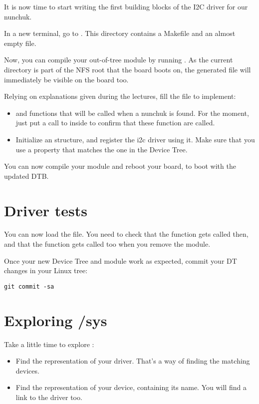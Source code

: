 It is now time to start writing the first building blocks of the I2C
driver for our nunchuk.

In a new terminal, go to
.  This directory
contains a Makefile and an almost empty  file.

Now, you can compile your out-of-tree module by running . As
the current directory is part of the NFS root that the board boots on,
the generated  file will immediately be visible on the board
too.

Relying on explanations given during the lectures, fill the
 file to implement:

\begin{itemize}
\item {} and  functions that will
      be called when a nunchuk is found.
      For the moment, just put a call to  inside
      to confirm that these function are called.
\item Initialize an  structure, and register
      the i2c driver using it. Make sure that you use
      a  property that matches the one in the
      Device Tree.
\end{itemize}

You can now compile your module and reboot your board, to 
boot with the updated DTB.

\section{Driver tests}

You can now load the  file.
You need to check that the  function gets called
then, and that the  function gets called too
when you remove the module.

Once your new Device Tree and module work as expected, commit
your DT changes in your Linux tree:

\begin{verbatim}
git commit -sa 
\end{verbatim}

\section{Exploring /sys}

Take a little time to explore :

\begin{itemize}
\item Find the representation of your driver. That's a way
      of finding the matching devices.
\item Find the representation of your device, containing its name.
      You will find a link to the driver too.
\end{itemize}
